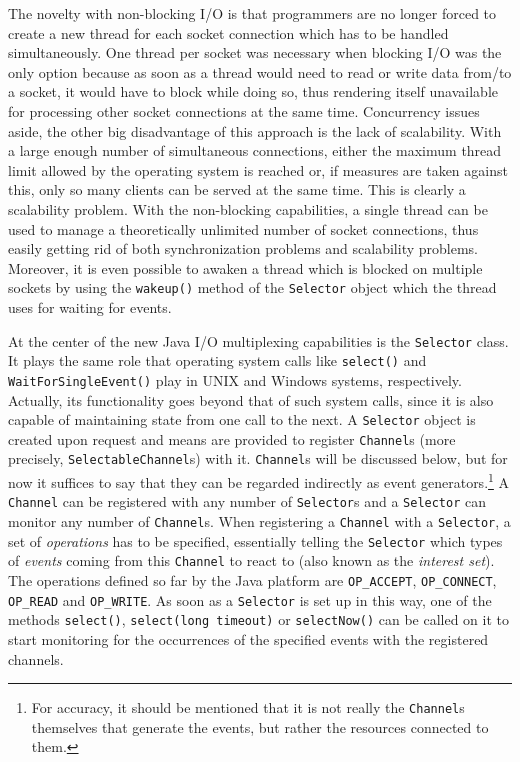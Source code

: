 \documentclass[a4paper,10pt]{article}
\begin{document}
The novelty with non-blocking I/O is that programmers are no longer forced to create a new thread for each socket
connection which has to be handled simultaneously. One thread per socket was necessary when blocking I/O was the
only option because as soon as a thread would need to read or write data from/to a socket, it would have to block while
doing so, thus rendering itself unavailable for processing other socket connections at the same time. Concurrency
issues aside, the other big disadvantage of this approach is the lack of scalability. With a large enough number of
simultaneous connections, either the maximum thread limit allowed by the operating system is reached or, if measures
are taken against this, only so many clients can be served at the same time. This is clearly a scalability problem. With
the non-blocking capabilities, a single thread can be used to manage a theoretically unlimited number of socket
connections, thus easily getting rid of both synchronization problems and scalability problems. Moreover, it is even
possible to awaken a thread which is blocked on multiple sockets by using the \texttt{wakeup()} method of the
\texttt{Selector} object which the thread uses for waiting for events.

At the center of the new Java I/O multiplexing capabilities is the \texttt{Selector} class. It plays the same role that
operating system calls like \texttt{select()} and \texttt{WaitForSingleEvent()} play in UNIX and Windows systems,
respectively. Actually, its functionality goes beyond that of such system calls, since it is also capable of maintaining
state from one call to the next. A \texttt{Selector} object is created upon request and means are provided to register
\texttt{Channel}s (more precisely, \texttt{SelectableChannel}s) with it. \texttt{Channel}s will be discussed below,
but for now it suffices to say that they can be regarded indirectly as event generators.\footnote{For accuracy, it should
be mentioned that it is not really the \texttt{Channel}s themselves that generate the events, but rather the resources
connected to them.} A \texttt{Channel} can be registered with any number of \texttt{Selector}s and a \texttt{Selector}
can monitor any number of \texttt{Channel}s. When registering a \texttt{Channel} with a \texttt{Selector}, a set
of \textit{operations} has to be specified, essentially telling the \texttt{Selector} which types of \textit{events} coming
from this \texttt{Channel} to react to (also known as the \textit{interest set}). The operations defined so far by the
Java platform are \texttt{OP\_ACCEPT}, \texttt{OP\_CONNECT}, \texttt{OP\_READ} and \texttt{OP\_WRITE}. As soon
as a \texttt{Selector} is set up in this way, one of the methods \texttt{select()}, \texttt{select(long timeout)} or
\texttt{selectNow()} can be called on it to start monitoring for the occurrences of the specified events with the registered
channels.
\end{document}
